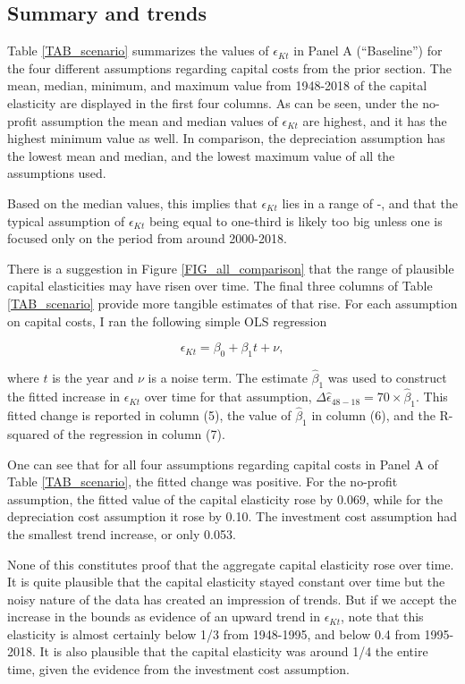 \documentclass[11pt]{article}
\begin{document}
\subsection{Summary and trends}
Table \ref{TAB_scenario} summarizes the values of $\epsilon_{Kt}$ in Panel A (``Baseline'') for the four different assumptions regarding capital costs from the prior section. The mean, median, minimum, and maximum value from 1948-2018 of the capital elasticity are displayed in the first four columns. As can be seen, under the no-profit assumption the mean and median values of $\epsilon_{Kt}$ are highest, and it has the highest minimum value as well. In comparison, the depreciation assumption has the lowest mean and median, and the lowest maximum value of all the assumptions used. 

Based on the median values, this implies that $\epsilon_{Kt}$ lies in a range of \basemeddepr-\basemednoprofit, and that the typical assumption of $\epsilon_{Kt}$ being equal to one-third is likely too big unless one is focused only on the period from around 2000-2018.

There is a suggestion in Figure \ref{FIG_all_comparison} that the range of plausible capital elasticities may have risen over time. The final three columns of Table \ref{TAB_scenario} provide more tangible estimates of that rise. For each assumption on capital costs, I ran the following simple OLS regression

\begin{equation}
	\epsilon_{Kt} = \beta_0 + \beta_1 t + \nu,
\end{equation}

where $t$ is the year and $\nu$ is a noise term. The estimate $\hat{\beta}_1$ was used to construct the fitted increase in $\epsilon_{Kt}$ over time for that assumption, $\Delta \hat{\epsilon}_{48-18} = 70 \times \hat{\beta}_1$. This fitted change is reported in column (5), the value of $\hat{\beta}_1$ in column (6), and the R-squared of the regression in column (7). 

One can see that for all four assumptions regarding capital costs in Panel A of Table \ref{TAB_scenario}, the fitted change was positive. For the no-profit assumption, the fitted value of the capital elasticity rose by 0.069, while for the depreciation cost assumption it rose by 0.10. The investment cost assumption had the smallest trend increase, or only 0.053. 

None of this constitutes proof that the aggregate capital elasticity rose over time. It is quite plausible that the capital elasticity stayed constant over time but the noisy nature of the data has created an impression of trends. But if we accept the increase in the bounds as evidence of an upward trend in $\epsilon_{Kt}$, note that this elasticity is almost certainly below 1/3 from 1948-1995, and below 0.4 from 1995-2018. It is also plausible that the capital elasticity was around 1/4 the entire time, given the evidence from the investment cost assumption.
\end{document}
